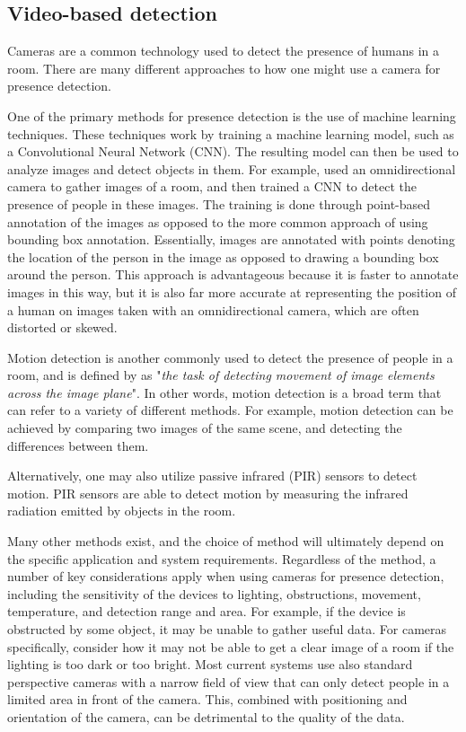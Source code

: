 \subsection{Video-based detection} \label{sec:video-based-detection}
Cameras are a common technology used to detect the presence of humans in a room.
There are many different approaches to how one might use a camera for presence detection.

One of the primary methods for presence detection is the use of machine learning techniques.
These techniques work by training a machine learning model, such as a Convolutional Neural Network (CNN).
The resulting model can then be used to analyze images and detect objects in them.
For example, \citeauthor{FUERTES2022103473}\cite{FUERTES2022103473} used an omnidirectional camera to gather images of a room, and then trained a CNN to detect the presence of people in these images.
The training is done through point-based annotation of the images as opposed to the more common approach of using bounding box annotation.
Essentially, images are annotated with points denoting the location of the person in the image as opposed to drawing a bounding box around the person.
This approach is advantageous because it is faster to annotate images in this way, but it is also far more accurate at representing the position of a human on images taken with an omnidirectional camera, which are often distorted or skewed.\cite{FUERTES2022103473}

Motion detection is another commonly used to detect the presence of people in a room, and is defined by \citeauthor{ANANDAN1988347}\cite{ANANDAN1988347} as "\textit{the task of detecting movement of image elements across the image plane}".
In other words, motion detection is a broad term that can refer to a variety of different methods.
For example, motion detection can be achieved by comparing two images of the same scene, and detecting the differences between them\cite{granath_detecting_nodate}.

Alternatively, one may also utilize passive infrared (PIR) sensors to detect motion.
PIR sensors are able to detect motion by measuring the infrared radiation emitted by objects in the room.\cite{Deiana2014}

Many other methods exist, and the choice of method will ultimately depend on the specific application and system requirements. 
Regardless of the method, a number of key considerations apply when using cameras for presence detection, including the sensitivity of the devices to lighting, obstructions, movement, temperature, and detection range and area.
For example, if the device is obstructed by some object, it may be unable to gather useful data.
For cameras specifically, consider how it may not be able to get a clear image of a room if the lighting is too dark or too bright.
Most current systems use also standard perspective cameras with a narrow field of view that can only detect people in a limited area in front of the camera\cite{FUERTES2022103473}.
This, combined with positioning and orientation of the camera, can be detrimental to the quality of the data.\cite{granath_detecting_nodate, tang_occupancy_2020}

